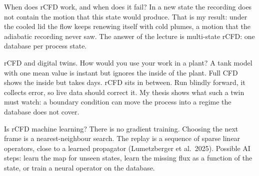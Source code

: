 \begin{qabox}{When does rCFD work, and when does it fail?}
\explain In a new state the recording does not contain the motion that this state would produce.
That is my result: under the cooled lid the flow keeps renewing itself with cold plumes, a motion
that the adiabatic recording never saw. The answer of the lecture is multi-state rCFD: one database
per process state.
\end{qabox}

\begin{qabox}{rCFD and digital twins. How would you use your work in a plant?}
\explain A tank model with one mean value is instant but ignores the inside of the plant. Full CFD
shows the inside but takes days. rCFD sits in between. Run blindly forward, it collects error, so
live data should correct it. My thesis shows what such a twin must watch: a boundary condition can
move the process into a regime the database does not cover.
\end{qabox}

\begin{qabox}{Is rCFD machine learning?}
\explain There is no gradient training. Choosing the next frame is a nearest-neighbour search. The
replay is a sequence of sparse linear operators, close to a learned propagator (Lumetzberger et
al.\ 2025). Possible AI steps: learn the map for unseen states, learn the missing flux as a
function of the state, or train a neural operator on the database.
\end{qabox}

